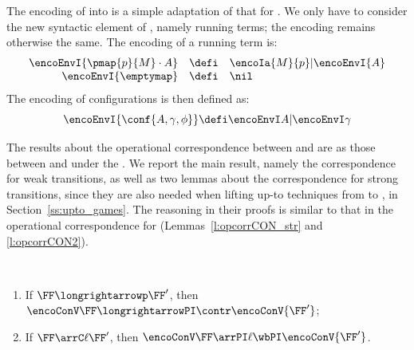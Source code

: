 The encoding of \COGS into \piI is a simple adaptation of that for \AOGS.
We only have to consider the new syntactic element of \COGS, 
namely running
terms; the encoding remains otherwise the same.
The encoding of a running term is: 
\[ 
\begin{array}{rcl}
\encoEnvI{\pmap{p}{M}\cdot A  } & \defi & 
 \encoIa {M}{p} |\encoEnvI{ A  } \\
\encoEnvI{\emptymap} & \defi & \nil
\end{array} 
\]
The encoding of configurations is then defined as:
\[
\encoEnvI{\conf{A, \gamma, \phi}}
\defi \encoEnvI A | \encoEnvI \gamma
\]

The results about the operational correspondence between \COGS and \piI 
are as those between \AOGS and \piI under the \opLTS. 
\DSOCTb
We  report the main result, namely the correspondence for weak transitions, as well as 
two lemmas about the  correspondence for strong transitions, since they are also needed
when lifting up-to techniques from 
 \piI to \COGS, in Section~\ref{ss:upto_games}.
The reasoning in their proofs is similar to that 
in the operational  correspondence for \AOGS
(Lemmas~\ref{l:opcorrCON_str} and
\ref{l:opcorrCON2}). 

 
\begin{lemma}
\label{l:opcorrCOGS}
$ $ \begin{enumerate}

\item If $\FF \longrightarrowp \FF'$, then 
$ \encoConV \FF \longrightarrowPI  \contr \encoConV {\FF'}$;


\item If $\FF \arrC\ell \FF'$, then
$ \encoConV \FF \arrPI\ell  
\wbPI
\encoConV {\FF'}$.
\end{enumerate} 
\end{lemma} 


